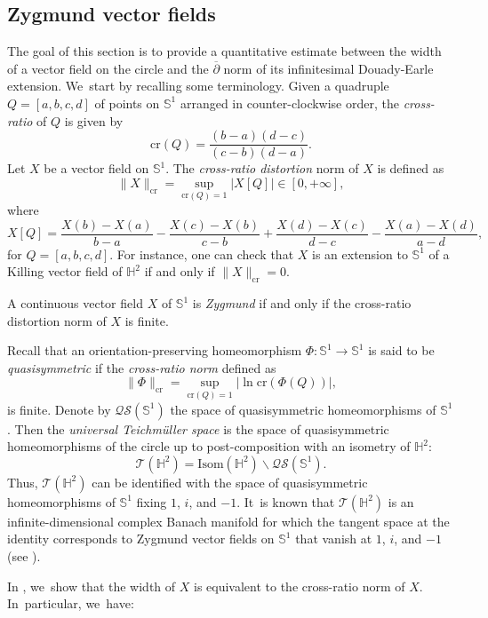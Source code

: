 \subsection{Zygmund vector fields}
The goal of this section is to provide a quantitative estimate between the width of a vector field on the circle and the $\overline{\partial}$ norm of its infinitesimal Douady-Earle extension. We~start by recalling some terminology. Given a quadruple $Q=[a,b,c,d]$ of points on $\mathbb{S}^1$ arranged in counter-clockwise order, the \emph{cross-ratio} of $Q$ is given by
\[
\mathrm{cr}(Q)=\frac{ (b-a)(d-c) }{ (c-b)(d-a) }.
\]
Let $X$ be a vector field on $\mathbb{S}^1$. The \emph{cross-ratio distortion} norm of $X$ is defined as
\[
\lVert X \rVert_\mathrm{cr}=\sup_{\mathrm{cr}(Q)=1}\vert X[Q]\vert \in[0,+\infty],
\]
where
\[
X[Q]=\frac{X(b)-X(a)}{b-a}-\frac{X(c)-X(b)}{c-b}+\frac{X(d)-X(c)}{d-c}-\frac{X(a)-X(d)}{a-d},
\]
for $Q=[a,b,c,d]$. For instance, one can check that $X$ is an extension to $\mathbb{S}^1$ of a Killing vector field of $\mathbb{H}^2$ if and only if $\lVert X\rVert_\mathrm{cr}=0$.

\begin{defi}
A continuous vector field $X$ of $\mathbb{S}^1$ is \emph{Zygmund} if and only if the cross-ratio distortion norm of $X$ is finite.
\end{defi}
Recall that an orientation-preserving homeomorphism $\Phi:\mathbb{S}^1\to\mathbb{S}^1$ is said to be \emph{quasisymmetric} if the \emph{cross-ratio norm} defined as
\[
\lVert \Phi \rVert_\mathrm{cr}=\sup_{\mathrm{cr}(Q)=1} \vert{\ln\mathrm{cr}\left(\Phi(Q)\right)} \vert ,
\]
is finite. Denote by $\mathcal{QS}(\mathbb{S}^1)$ the space of quasisymmetric homeomorphisms of $\mathbb{S}^1$. Then the \emph{universal Teichmüller space} is the space of quasisymmetric homeomorphisms of the circle up to post-composition with an isometry of $\mathbb{H}^2$:
\[
\mathcal{T}(\mathbb{H}^2)=\mathrm{Isom}(\mathbb{H}^2)\backslash \mathcal{QS}(\mathbb{S}^1).
\]
Thus, $\mathcal{T}(\mathbb{H}^2)$ can be identified with the space of quasisymmetric homeomorphisms of $\mathbb{S}^1$ fixing $1$, $i$, and $-1$. It~is known that $\mathcal{T}(\mathbb{H}^2)$ is an infinite-dimensional complex Banach manifold for which the tangent space at the identity corresponds to Zygmund vector fields on $\mathbb{S}^1$ that vanish at $1$, $i$, and $-1$ (see \cite{Gardiner1999QuasiconformalTT}).

In \cite[Th.\,1.3]{diaf2023Infearth}, we~show that the width of $X$ is equivalent to the cross-ratio norm of $X$. In~particular, we~have:

